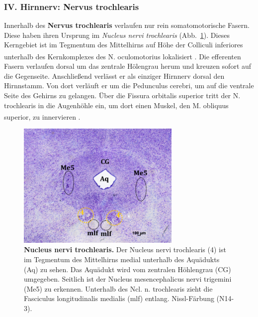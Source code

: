 \subsubsection*{IV. Hirnnerv: Nervus trochlearis} 
Innerhalb des \textbf{Nervus trochlearis} verlaufen nur rein somatomotorische Fasern. Diese haben ihren Ursprung im \textit{Nucleus nervi trochlearis}  (Abb.~\ref{fig:nucleus_trochlearis}). Dieses Kerngebiet ist im Tegmentum des Mittelhirns auf Höhe der Colliculi inferiores unterhalb des Kernkomplexes des N. oculomotorius lokalisiert \textsuperscript{\cite[Kap.~5]{trepel2011neuroanatomie}}. Die efferenten Fasern verlaufen dorsal um das zentrale Hölengrau herum und kreuzen sofort auf die Gegenseite. Anschließend verlässt er als einziger Hirnnerv dorsal den Hirnnstamm. Von dort verläuft er um die Pedunculus cerebri, um auf die ventrale Seite des Gehirns zu gelangen. Über die Fissura orbitalis superior tritt der N. trochlearis in die Augenhöhle ein, um dort einen Muskel, den M. obliquus superior, zu innervieren \textsuperscript{\cite[Kap.~10]{crossman2014neuroanatomy}}.   

\begin{figure}[H]
    \centering
    \includegraphics[width=0.7\textwidth]{pictures/Bilder_Laura/nucleus_trochlearis_N14_3M_25x.png}
    \caption[Nucleus nervi trochlearis]{\textbf{Nucleus nervi trochlearis.} Der Nucleus nervi trochlearis (4) ist im Tegmentum des Mittelhirns medial unterhalb des Aquädukts (Aq) zu sehen. Das Aquädukt wird vom zentralen Höhlengrau (CG) umgegeben. Seitlich ist der  Nucleus mesencephalicus nervi trigemini (Me5) zu erkennen. Unterhalb des Ncl. n. trochlearis zieht die Fasciculus longitudinalis medialis (mlf) entlang. Nissl-Färbung (N14-3).}
    \label{fig:nucleus_trochlearis}
\end{figure}

